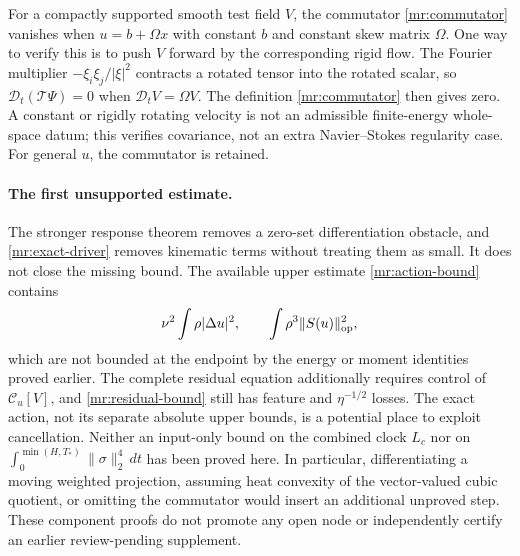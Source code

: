 \begin{remark}\label{mr:rigid}
For a compactly supported smooth test field $V$, the commutator
\eqref{mr:commutator} vanishes when $u=b+\Omega x$ with constant $b$
and constant skew matrix $\Omega$. One way to verify this is to push $V$
forward by the corresponding rigid flow. The Fourier multiplier
$-\xi_i\xi_j/|\xi|^2$ contracts a rotated tensor into the rotated scalar,
so $\mathcal D_t(\mathcal T\Psi)=0$ when
$\mathcal D_tV=\Omega V$. The definition \eqref{mr:commutator} then
gives zero. A constant or rigidly rotating velocity is not an admissible
finite-energy whole-space datum; this verifies covariance, not an extra
Navier--Stokes regularity case. For general $u$, the commutator is retained.
\end{remark}

\paragraph{The first unsupported estimate.}
The stronger response theorem removes a zero-set differentiation obstacle,
and \eqref{mr:exact-driver} removes kinematic terms without treating them
as small. It does not close the missing bound. The available upper estimate
\eqref{mr:action-bound} contains
\[
 \nu^2\int\rho|\Delta u|^2,
       \qquad \int\rho^3\|S(u)\|_{\rm op}^2,
\]
which are not bounded at the endpoint by the energy or moment identities
proved earlier. The complete residual equation additionally requires
control of $\mathcal C_u[V]$, and \eqref{mr:residual-bound} still has
feature and $\eta^{-1/2}$ losses. The exact action, not its separate
absolute upper bounds, is a potential place to exploit cancellation.
Neither an input-only bound on the combined clock $L_c$ nor on
$\int_0^{\min(H,T_*)}\|\sigma\|_2^4\,dt$ has been proved here.
In particular, differentiating a moving weighted projection, assuming
heat convexity of the vector-valued cubic quotient, or omitting the
commutator would insert an additional unproved step. These component
proofs do not promote any open node or independently certify an earlier
review-pending supplement.
